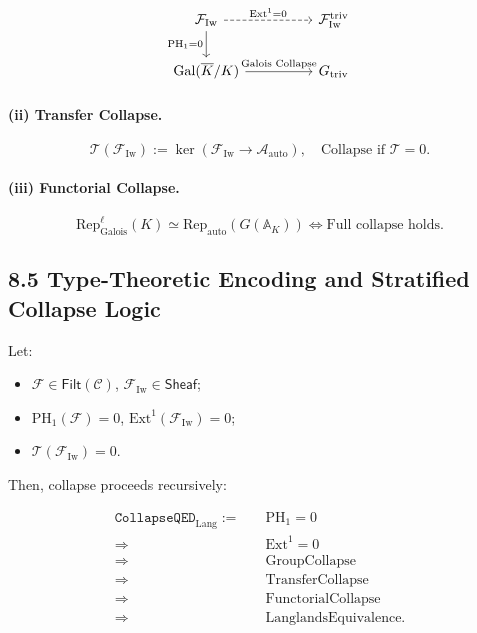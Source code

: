 \documentclass[11pt]{article}
\begin{document}
\[
\begin{tikzcd}[column sep=huge]
\mathcal{F}_{\mathrm{Iw}} \arrow[r, dashed, "\mathrm{Ext}^1 = 0"] \arrow[d, "\mathrm{PH}_1 = 0"']
& \mathcal{F}_{\mathrm{Iw}}^{\mathrm{triv}} \\
\mathrm{Gal}(\overline{K}/K) \arrow[r, "\text{Galois Collapse}"]
& G_{\mathrm{triv}}
\end{tikzcd}
\]

\paragraph{(ii) Transfer Collapse.}

\[
\mathcal{T}(\mathcal{F}_{\mathrm{Iw}}) := \ker \left( \mathcal{F}_{\mathrm{Iw}} \to \mathcal{A}_{\mathrm{auto}} \right), \quad
\text{Collapse if } \mathcal{T} = 0.
\]

\paragraph{(iii) Functorial Collapse.}

\[
\mathrm{Rep}_{\mathrm{Galois}}^\ell(K) \simeq \mathrm{Rep}_{\mathrm{auto}}(G(\mathbb{A}_K)) \iff \text{Full collapse holds}.
\]

\subsection*{8.5 Type-Theoretic Encoding and Stratified Collapse Logic}

Let:

\begin{itemize}
    \item \( \mathcal{F} \in \mathsf{Filt}(\mathcal{C}) \), \( \mathcal{F}_{\mathrm{Iw}} \in \mathsf{Sheaf} \);
    \item \( \mathrm{PH}_1(\mathcal{F}) = 0 \), \( \mathrm{Ext}^1(\mathcal{F}_{\mathrm{Iw}}) = 0 \);
    \item \( \mathcal{T}(\mathcal{F}_{\mathrm{Iw}}) = 0 \).
\end{itemize}

Then, collapse proceeds recursively:

\[
\begin{aligned}
\texttt{CollapseQED}_{\mathrm{Lang}} :=\quad
& \mathrm{PH}_1 = 0 \\
\Rightarrow\ & \mathrm{Ext}^1 = 0 \\
\Rightarrow\ & \text{GroupCollapse} \\
\Rightarrow\ & \text{TransferCollapse} \\
\Rightarrow\ & \text{FunctorialCollapse} \\
\Rightarrow\ & \text{LanglandsEquivalence}.
\end{aligned}
\]
\end{document}
